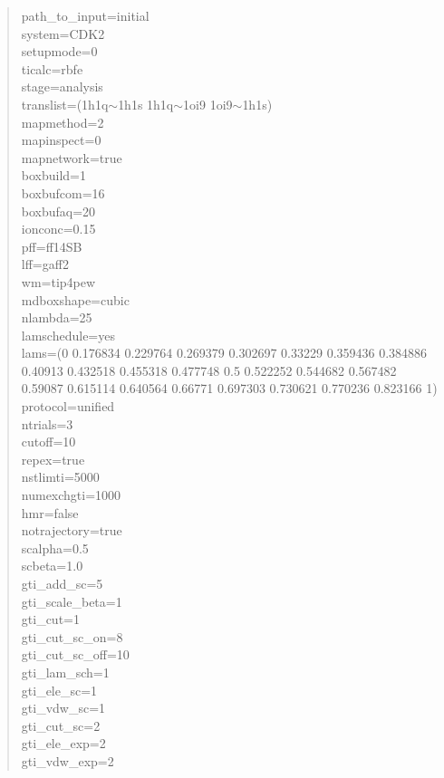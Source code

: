 \documentclass[11pt,letterpaper,titlepage]{article}
\newenvironment{itquote}
  {\begin{quote}\itshape}
  {\end{quote}\ignorespacesafterend}
\begin{document}
\vspace{1cm}
\begin{itquote}
	
{\color{blue}
	
path\_to\_input=initial 			\\
system=CDK2 					\\
setupmode=0                      		\\
ticalc=rbfe                      		\\
stage=analysis                   		\\
translist=(1h1q$\sim$1h1s 1h1q$\sim$1oi9 1oi9$\sim$1h1s) 	\\

mapmethod=2 					\\
mapinspect=0 					\\
mapnetwork=true 				\\

boxbuild=1 					\\
boxbufcom=16  		 			\\
boxbufaq=20		 			\\
ionconc=0.15		 			\\
pff=ff14SB					\\
lff=gaff2					\\
wm=tip4pew					\\
mdboxshape=cubic				\\

nlambda=25  					\\
lamschedule=yes					\\
lams=(0 0.176834 0.229764 0.269379 0.302697 0.33229 0.359436 0.384886 0.40913 0.432518 0.455318 0.477748 0.5 0.522252 0.544682 0.567482 0.59087 0.615114 0.640564 0.66771 0.697303 0.730621 0.770236 0.823166 1) \\
protocol=unified 				\\

ntrials=3					\\

cutoff=10               			\\
repex=true 					\\
nstlimti=5000           			\\
numexchgti=1000         			\\
hmr=false 					\\
notrajectory=true				\\
scalpha=0.5             			\\
scbeta=1.0              			\\
gti\_add\_sc=5 					\\
gti\_scale\_beta=1      			\\
gti\_cut=1              			\\
gti\_cut\_sc\_on=8      			\\
gti\_cut\_sc\_off=10    			\\
gti\_lam\_sch=1         			\\
gti\_ele\_sc=1          			\\
gti\_vdw\_sc=1          			\\
gti\_cut\_sc=2          			\\
gti\_ele\_exp=2         			\\
gti\_vdw\_exp=2         			\\

}
\end{itquote}
\end{document}
